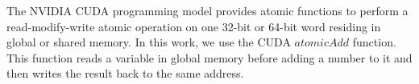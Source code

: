 The NVIDIA CUDA programming model provides atomic functions to perform a read-modify-write atomic operation on one 32-bit or 64-bit word
residing in global or shared memory. In this work, we use the CUDA $atomicAdd$ function. This function reads a variable in global memory
before adding a number to it and then writes the result back to the same address.

